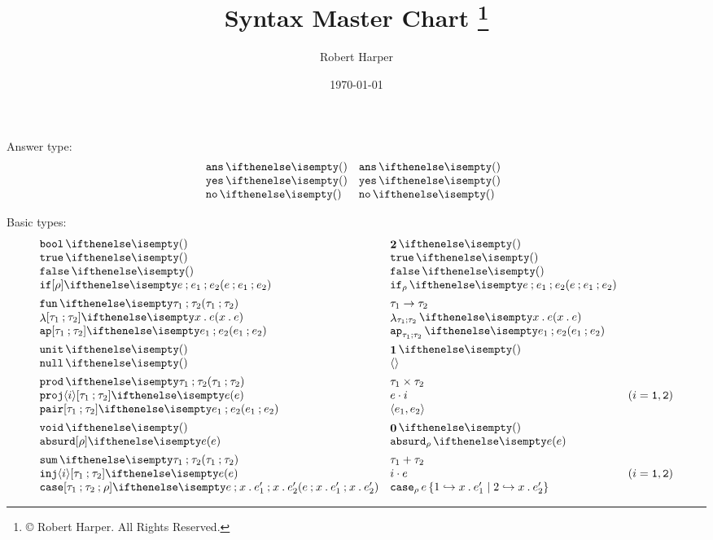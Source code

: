 \documentclass[11pt,twoside]{article}
\title{\PFPL{} Syntax Master Chart%
\footnote{\copyright{} \the\year{} Robert Harper.  All Rights Reserved.}}
\author{Robert Harper}
\date{\today}
\begin{document}
\maketitle{}


Answer type:
\begin{displaymath}
  \begin{array}{l@{\quad}l@{\quad}l}
    \ansty & \ansty* \\
    \yesex & \yesex* \\
    \noex & \noex*
  \end{array}
\end{displaymath}

Basic types:
\begin{displaymath}
  \begin{array}{l@{\quad}l@{\quad}l}
    \boolty & \boolty* \\
    \trueex & \trueex* \\
    \falseex & \falseex* \\
    \ifex{e}{e_1}{e_2} & \ifex*{e}{e_1}{e_2} \\[1ex]

    \arrty{\tau_1}{\tau_2} & \arrty*{\tau_1}{\tau_2} \\
    \lamex{x}{e} & \lamex*{x}{e} \\
    \appex{e_1}{e_2} & \appex*{e_1}{e_2} \\[1ex]

    \unitty{} & \unitty*{} \\
    \unitex{} & \unitex*{} \\[1ex]

    \prodty{\tau_1}{\tau_2} & \prodty*{\tau_1}{\tau_2} \\
    \projex<i>{e} & \projex*<i>{e} & (i=\kw{1},\kw{2}) \\
    \pairex{e_1}{e_2} & \pairex*{e_1}{e_2} \\[1ex]

    \voidty & \voidty* \\
    \absurdex[\rho]{e} & \absurdex*{e} \\[1ex]

    \sumty{\tau_1}{\tau_2} & \sumty*{\tau_1}{\tau_2} \\
    \injex<i>[\tau_1][\tau_2]{e} & \injex*<i>{e} & (i=\kw{1},\kw{2}) \\
    \caseex[\tau][\rho]{e}{x}{e'} & \multicolumn{2}{l}{\!\!\!\caseex*{e}{x}{e'}}   %

  \end{array}
\end{displaymath}
\end{document}

